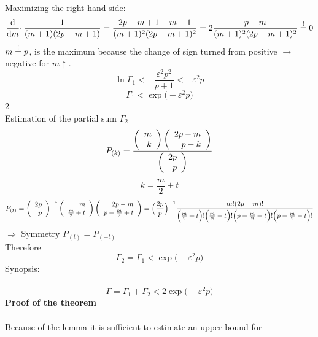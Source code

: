Maximizing the right hand side:
\begin{equation}
	\frac{ \mathrm{d} }{ \mathrm{d}m } \cdotp
		\frac{ 1 }{ (m + 1)(2p - m + 1) } 
	= \frac{ 2p - m + 1 - m - 1 }{ (m + 1)^2 (2p - m + 1)^2 }
	= 2\frac{ p - m }{ (m + 1)^2 (2p - m + 1)^2 } \stackrel{\mathrm{!}}{=} 0 
\end{equation}
$m \stackrel{\mathrm{!}}{=} p$, is the maximum because the change of sign turned from positive $\rightarrow$ negative for $m\uparrow$.
\begin{equation}
	\ln \Gamma_1 < -\frac{ \varepsilon^2 p^2 }{ p + 1 } < -\varepsilon^2 p
\end{equation}
\begin{equation}
	\Gamma_1 < \exp\big( -\varepsilon^2 p\big)
\end{equation}
\textcircled{2}\\
Estimation of the partial sum $\Gamma_2$
\begin{equation}
	P_{ (k) } = \frac{ \left( \begin{array}{rrrrrrrrrrrrrrrrrrrrrrrrrr} m\\k\\ \end{array} \right) \left( \begin{array}{rrrrrrrrrrrrrrrrrrrrrrrrrr} 2p-m\\p-k\\ \end{array} \right) }{ \left( \begin{array}{rrrrrrrrrrrrrrrrrrrrrrrrrr} 2p\\p\\ \end{array} \right) }
\end{equation}
\begin{equation}
	k = \frac{m}{2} + t
\end{equation}
\begin{equation}
	P_{ (t) } = \left( \begin{array}{rrrrrrrrrrrrrrrrrrrrrrrrrr} 2p\\p\\ \end{array} \right)^{-1} \left( \begin{array}{rrrrrrrrrrrrrrrrrrrrrrrrrr} m\\\frac{m}{2}+t\\ \end{array} \right) 
			\left( \begin{array}{rrrrrrrrrrrrrrrrrrrrrrrrrr} 2p-m\\p-\frac{m}{2}+t\\ \end{array} \right)
		= \Big( \frac{2p}{p} \Big)^{-1} 
			\frac{ m\mathrm{!} ( 2p - m )\mathrm{!} }
			{ \Big( \frac{m}{2} + t \Big)\mathrm{!}
			  \Big( \frac{m}{2} - t \Big)\mathrm{!}
			  \Big( p - \frac{m}{2} + t \Big)\mathrm{!}
			  \Big( p - \frac{m}{2} - t \Big)\mathrm{!} }
\end{equation}
$\Rightarrow$ Symmetry $P_{ (t) } = P_{ (-t) }$\\
Therefore
\begin{equation}
	\Gamma_2 = \Gamma_1 < \exp \big(-\varepsilon^2 p\big)
\end{equation}
\underline{Synopsis:}\\\\
\begin{equation}
	\Gamma = \Gamma_1 + \Gamma_2 < 2\exp \big(-\varepsilon^2 p \big)
\end{equation}
{\bf Proof of the theorem} 
\\\\
Because of the lemma it is sufficient to estimate an upper bound for
